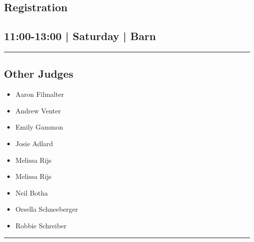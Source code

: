 \documentclass[10pt, A5]{article}
\begin{document}
        \begin{framed}
        \begin{minipage}{\textwidth}

        \setcounter{section}{5}
        \section{Registration}
        \subsection*{11:00-13:00 | Saturday | Barn}

        \vspace{0.25cm}
        \hrule
        \vspace{0.25cm}


        \subsection*{Other Judges}
                    

        	\begin{multicols}{2}

		\begin{itemize}
									\item Aaron Filmalter
									\item Andrew Venter
									\item Emily Gammon
									\item Josie Adlard
									\item Melissa Rijs
						\end{itemize}

		\vfill\null
		\columnbreak

		\begin{itemize}
									\item Melissa Rijs
									\item Neil Botha
									\item Orsella Schneeberger
									\item Robbie Schreiber
						\end{itemize}

		\vfill\null

		\end{multicols}

    \vspace{0.25cm}
        \hrule
        \vspace{0.25cm}

        \begin{multicols}{2}


\end{multicols}
\end{minipage}
\end{framed}
\end{document}
